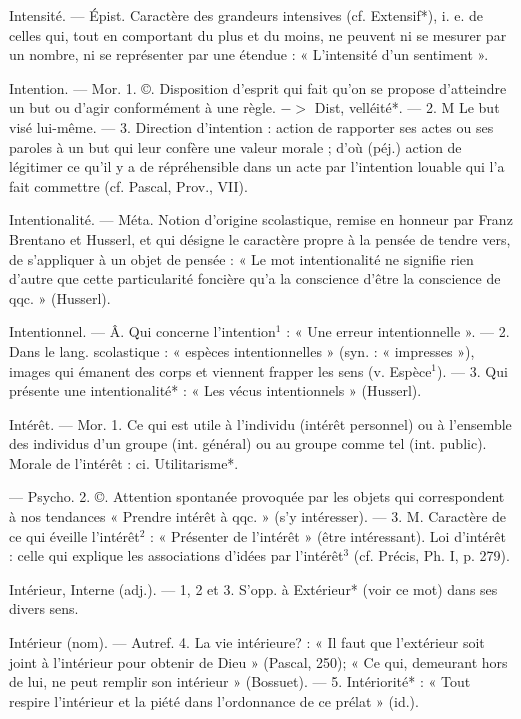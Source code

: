 Intensité. — Épist. Caractère des
grandeurs intensives (cf. Extensif*),
i. e. de celles qui, tout en comportant du plus et du moins, ne peuvent ni se mesurer par un nombre,
ni se représenter par une étendue :
« L’intensité d’un sentiment ».

Intention. — Mor. 1. ©. Disposition
d'esprit qui fait qu’on se propose
d'atteindre un but ou d’agir conformément à une règle. $->$ Dist,
velléité*. — 2. M Le but visé lui-même. — 3. Direction d'intention :
action de rapporter ses actes ou ses
paroles à un but qui leur confère
une valeur morale ; d’où (péj.)
action de légitimer ce qu'il y a de
répréhensible dans un acte par l'intention louable qui l'a fait commettre (cf. Pascal, Prov., VII).

Intentionalité. — Méta. Notion d'origine scolastique, remise en honneur par Franz Brentano et Husserl,
et qui désigne le caractère propre à
la pensée de tendre vers, de s’appliquer à un objet de pensée : « Le mot
intentionalité ne signifie rien d’autre
que cette particularité foncière qu’a
la conscience d’être la conscience
de qqc. » (Husserl).

Intentionnel. — Â. Qui concerne l'intention$^1$ : « Une erreur intentionnelle ». — 2. Dans le lang. scolastique : « espèces intentionnelles »
(syn. : « impresses »), images qui
émanent des corps et viennent
frapper les sens (v. Espèce$^1$). —
3. Qui présente une intentionalité* :
« Les vécus intentionnels » (Husserl).

Intérêt. — Mor. 1. Ce qui est utile à
l'individu (intérêt personnel) ou à
l’ensemble des individus d’un groupe
(int. général) ou au groupe comme tel
(int. public). Morale de l'intérêt : ci.
Utilitarisme*.

— Psycho. 2. ©. Attention spontanée provoquée par les objets qui
correspondent à nos tendances
« Prendre intérêt à qqc. » (s’y intéresser). — 3. M. Caractère de ce qui
éveille l'intérêt$^2$ : « Présenter de
l'intérêt » (être intéressant). Loi
d'intérêt : celle qui explique les associations d'idées par l'intérêt$^3$ (cf.
Précis, Ph. I, p. 279).

Intérieur, Interne (adj.). — 1, 2 et 3.
S'opp. à Extérieur* (voir ce mot)
dans ses divers sens.

Intérieur (nom). — Autref. 4. La vie
intérieure? : « Il faut que l’extérieur
soit joint à l’intérieur pour obtenir
de Dieu » (Pascal, 250); « Ce qui,
demeurant hors de lui, ne peut remplir son intérieur » (Bossuet). —
5. Intériorité* : « Tout respire l’intérieur et la piété dans l’ordonnance
de ce prélat » (id.).


